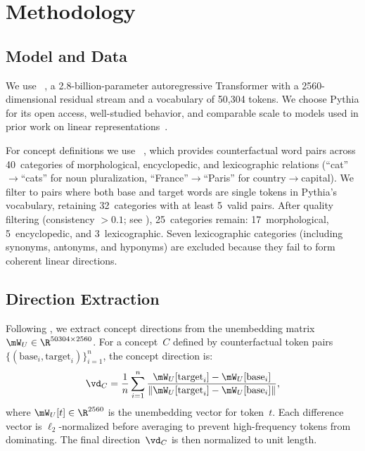 \section{Methodology}
\label{sec:method}

\subsection{Model and Data}
\label{sec:model_data}

We use \pythia~\citep{biderman2023pythia}, a 2.8-billion-parameter autoregressive Transformer with a 2560-dimensional residual stream and a vocabulary of 50{,}304 tokens.
We choose Pythia for its open access, well-studied behavior, and comparable scale to models used in prior work on linear representations~\citep{park2024linear}.

For concept definitions we use \bats~\citep{gladkova2016analogy}, which provides counterfactual word pairs across 40~categories of morphological, encyclopedic, and lexicographic relations (\eg ``cat''$\to$``cats'' for noun pluralization, ``France''$\to$``Paris'' for country$\to$capital).
We filter to pairs where both base and target words are single tokens in Pythia's vocabulary, retaining 32~categories with at least 5~valid pairs.
After quality filtering (\loo consistency $> 0.1$; see ), 25~categories remain: 17~morphological, 5~encyclopedic, and 3~lexicographic.
Seven lexicographic categories (including synonyms, antonyms, and hyponyms) are excluded because they fail to form coherent linear directions.

\subsection{Direction Extraction}
\label{sec:extraction}

Following \citet{park2024linear}, we extract concept directions from the unembedding matrix $\Wu \in \R^{50304 \times 2560}$.
For a concept~$C$ defined by counterfactual token pairs $\{(\text{base}_i, \text{target}_i)\}_{i=1}^{n}$, the concept direction is:
\begin{equation}
\label{eq:direction}
\vd_C = \frac{1}{n} \sum_{i=1}^{n} \frac{\Wu[\text{target}_i] - \Wu[\text{base}_i]}{\|\Wu[\text{target}_i] - \Wu[\text{base}_i]\|},
\end{equation}
where $\Wu[t] \in \R^{2560}$ is the unembedding vector for token~$t$.
Each difference vector is $\ell_2$-normalized before averaging to prevent high-frequency tokens from dominating.
The final direction~$\vd_C$ is then normalized to unit length.

